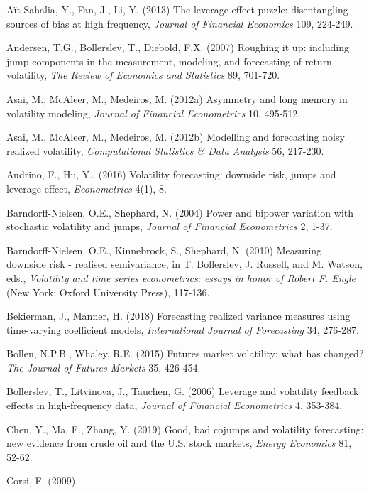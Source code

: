 \documentclass[10pt]{article}
\begin{document}
\newpage
\fontsize{11pt}{19pt}\selectfont
\begin{thebibliography}{99}
\item[A\"{i}t-Sahalia, Y., Fan, J., Li, Y. (2013)] 
The leverage effect puzzle: disentangling sources of bias at high frequency, 
\textit{Journal of Financial Economics} 109, 224-249. 
\item[Andersen, T.G., Bollerslev, T., Diebold, F.X. (2007)] 
Roughing it up: including jump components in the measurement, modeling, and forecasting of return volatility, 
\textit{The Review of Economics and Statistics} 89, 701-720. 
\item[Asai, M., McAleer, M., Medeiros, M. (2012a)]
Asymmetry and long memory in volatility modeling, 
\textit{Journal of Financial Econometrics} 10, 495-512. 
\item[Asai, M., McAleer, M., Medeiros, M. (2012b)]
Modelling and forecasting noisy realized volatility, 
\textit{Computational Statistics \& Data Analysis} 56, 217-230. 
\item[Audrino, F., Hu, Y., (2016)] 
Volatility forecasting: downside risk, jumps and leverage effect, 
\textit{Econometrics} 4(1), 8.  
\item[Barndorff-Nielsen, O.E., Shephard, N. (2004)] 
Power and bipower variation with stochastic volatility and jumps, 
\textit{Journal of Financial Econometrics} 2, 1-37.  
\item[Barndorff-Nielsen, O.E., Kinnebrock, S., Shephard, N. (2010)] 
Measuring downside risk - realised semivariance, in T. Bollerslev, J. Russell, and M. Watson, eds., 
\textit{Volatility and time series econometrics: essays in honor of Robert F. Engle} (New York: Oxford University Press), 117-136. 
\item[Bekierman, J., Manner, H. (2018)]
Forecasting realized variance measures using time-varying coefficient models, 
\textit{International Journal of Forecasting} 34, 276-287. 
\item[Bollen, N.P.B., Whaley, R.E. (2015)]
Futures market volatility: what has changed?
\textit{The Journal of Futures Markets} 35, 426-454. 
\item[Bollerslev, T., Litvinova, J., Tauchen, G. (2006)] 
Leverage and volatility feedback effects in high-frequency data, 
\textit{Journal of Financial Econometrics} 4, 353-384. 
\item[Chen, Y., Ma, F., Zhang, Y. (2019)] 
Good, bad cojumps and volatility forecasting: new evidence from crude oil and the U.S. stock markets, 
\textit{Energy Economics} 81, 52-62.
\item[Corsi, F. (2009)] 

\end{thebibliography}
\end{document}
